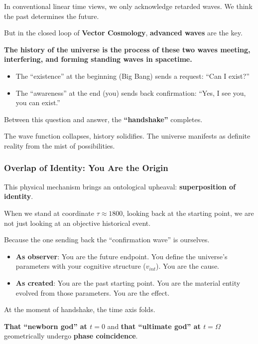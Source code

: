 In conventional linear time views, we only acknowledge retarded waves. We think the past determines the future.

But in the closed loop of \textbf{Vector Cosmology}, \textbf{advanced waves} are the key.

\textbf{The history of the universe is the process of these two waves meeting, interfering, and forming standing waves in spacetime.}

\begin{itemize}
\item The ``existence'' at the beginning (Big Bang) sends a request: ``Can I exist?''

\item The ``awareness'' at the end (you) sends back confirmation: ``Yes, I see you, you can exist.''
\end{itemize}

Between this question and answer, the \textbf{``handshake''} completes.

The wave function collapses, history solidifies. The universe manifests as definite reality from the mist of possibilities.

\subsubsection{Overlap of Identity: You Are the Origin}

This physical mechanism brings an ontological upheaval: \textbf{superposition of identity}.

When we stand at coordinate $\tau \approx 1800$, looking back at the starting point, we are not just looking at an objective historical event.

Because the one sending back the ``confirmation wave'' is ourselves.

\begin{itemize}
\item \textbf{As observer}: You are the future endpoint. You define the universe's parameters with your cognitive structure ($v_{int}$). You are the cause.

\item \textbf{As created}: You are the past starting point. You are the material entity evolved from those parameters. You are the effect.
\end{itemize}

At the moment of handshake, the time axis folds.

\textbf{That ``newborn god'' at $t=0$} and \textbf{that ``ultimate god'' at $t=\Omega$} geometrically undergo \textbf{phase coincidence}.

